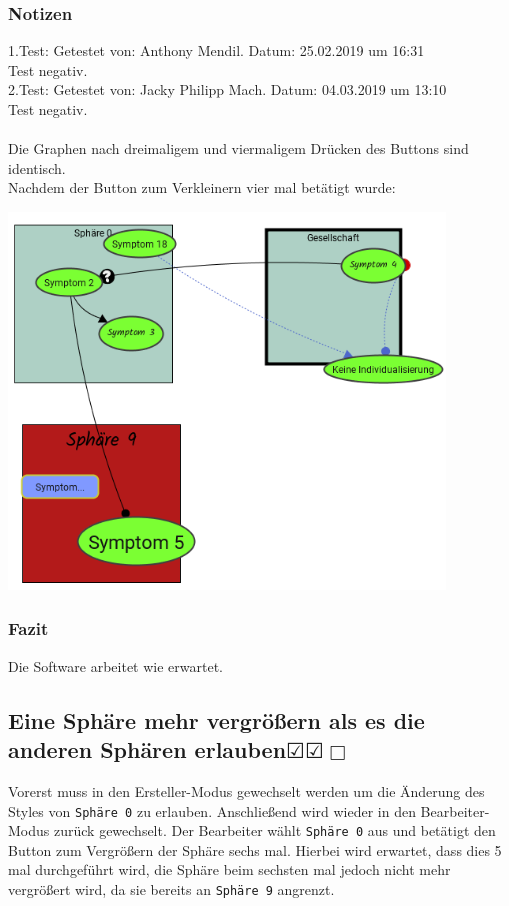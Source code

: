 \documentclass[enabledeprecatedfontcommands]{scrartcl}
\newcommand{\subsectiont}[2]{\subsection[#1]{#1{\normalsize\normalfont #2}}}
\newcommand{\leer}{$\Box$}
\newcommand{\ok}{$\CheckedBox$}
\begin{document}
\subsubsection{Notizen}
1.Test: Getestet von: Anthony Mendil. Datum: 25.02.2019 um 16:31 \\
Test negativ. \\
2.Test: Getestet von: Jacky Philipp Mach. Datum: 04.03.2019 um 13:10 \\
Test negativ.\\\\
Die Graphen nach dreimaligem und viermaligem Drücken des Buttons sind identisch. \\
Nachdem der Button zum Verkleinern vier mal betätigt wurde: 
\begin{center}
\includegraphics[height=10cm]{3_51.PNG}
\end{center}
\subsubsection{Fazit}
Die Software arbeitet wie erwartet.
\newpage
\subsectiont{Eine Sphäre mehr vergrößern als es die \\anderen Sphären erlauben}{\dotfill\ok\ok\leer}
Vorerst muss in den Ersteller-Modus gewechselt werden um die Änderung des Styles von \texttt{Sphäre 0} zu erlauben. Anschließend wird wieder in den Bearbeiter-Modus zurück gewechselt. Der Bearbeiter wählt \texttt{Sphäre 0} aus und betätigt den Button zum Vergrößern der Sphäre sechs mal. Hierbei wird erwartet, dass dies 5 mal durchgeführt wird, die Sphäre beim sechsten mal jedoch nicht mehr vergrößert wird, da sie bereits an \texttt{Sphäre 9} angrenzt.
\end{document}
